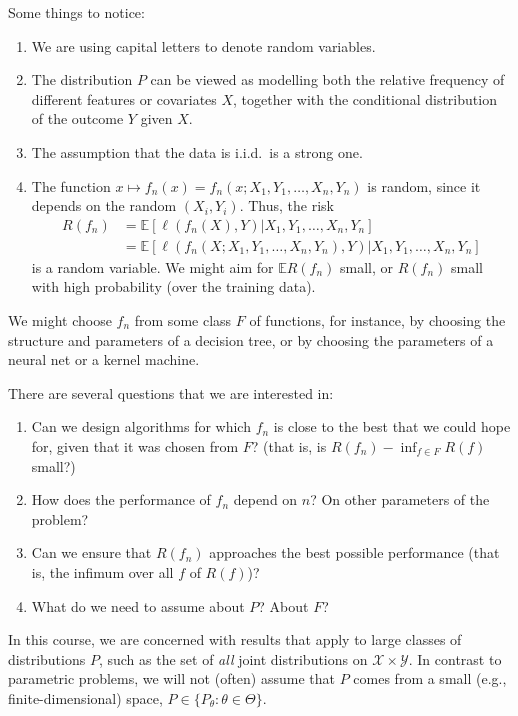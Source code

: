 \documentclass[twoside]{article}
\theoremstyle{definition}
\theoremstyle{definition}
\theoremstyle{remark}
\def\X{{\mathcal X}}
\def\Y{{\mathcal Y}}
\def\E{{\mathbb E}}
\begin{document}
Some things to notice:
  \begin{enumerate}
    \item We are using capital letters to denote random variables.
    \item The distribution $P$ can be viewed as modelling both
    the relative frequency of different features or covariates
    $X$, together with the conditional distribution of the outcome
    $Y$ given $X$.
    \item The assumption that the data is i.i.d.~is a strong one.
    \item The function $x\mapsto f_n(x)=f_n(x;
    X_1,Y_1,\ldots,X_n,Y_n)$ is random, since it depends on the random
    $(X_i,Y_i)$. Thus, the risk
      \begin{align*}
        R(f_n)
        & = \E\left[\ell(f_n(X),Y)|
	  X_1,Y_1,\ldots,X_n,Y_n\right] \\
	& = \E\left[\ell(f_n(X;X_1,Y_1,\ldots,X_n,Y_n),Y)|
	  X_1,Y_1,\ldots,X_n,Y_n\right]
      \end{align*}
    is a random variable. We might aim for $\E R(f_n)$ small, or
    $R(f_n)$ small with high probability (over the training data).
  \end{enumerate}

We might choose $f_n$ from some class $F$ of functions, for
instance, by choosing the structure and parameters of a decision
tree, or by choosing the parameters of a neural net or a kernel
machine.

There are several questions that we are interested in:
  \begin{enumerate}
    \item Can we design algorithms for which $f_n$ is
    close to the best that we could hope for, given that it was chosen
    from $F$? (that is, is $R(f_n)-\inf_{f\in F}R(f)$ small?)
    \item How does the performance of $f_n$ depend on $n$? On other
    parameters of the problem?
    \item Can we ensure that $R(f_n)$ approaches the best possible
    performance (that is, the infimum over all $f$ of $R(f)$)?
    \item What do we need to assume about $P$? About $F$?
  \end{enumerate}

In this course, we are concerned with results that apply to
large classes of distributions $P$, such as the set of {\em all}
joint distributions on $\X\times\Y$. In contrast to parametric
problems, we will not (often) assume that $P$ comes from a small
(e.g., finite-dimensional) space, $P\in \{P_\theta:\theta\in\Theta\}$.
\end{document}
